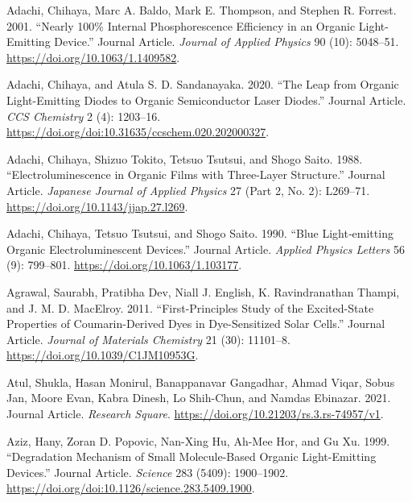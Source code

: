 \documentclass[
  letterpaper,
  DIV=11,
  numbers=noendperiod,
  oneside]{scrreprt}
\newlength{\cslhangindent}
\newlength{\cslentryspacingunit} %
\newenvironment{CSLReferences}[2] %
 {%
  \setlength{\parindent}{0pt}
  \ifodd #1
  \let\oldpar\par
  \def\par{\hangindent=\cslhangindent\oldpar}
  \fi
  \setlength{\parskip}{#2\cslentryspacingunit}
 }%
 {}
\begin{document}
\hypertarget{refs}{}
\begin{CSLReferences}{1}{0}
\leavevmode{}%
Adachi, Chihaya, Marc A. Baldo, Mark E. Thompson, and Stephen R.
Forrest. 2001. {``Nearly 100\% Internal Phosphorescence Efficiency in an
Organic Light-Emitting Device.''} Journal Article. \emph{Journal of
Applied Physics} 90 (10): 5048--51.
\url{https://doi.org/10.1063/1.1409582}.

\leavevmode{}%
Adachi, Chihaya, and Atula S. D. Sandanayaka. 2020. {``The Leap from
Organic Light-Emitting Diodes to Organic Semiconductor Laser Diodes.''}
Journal Article. \emph{CCS Chemistry} 2 (4): 1203--16.
\url{https://doi.org/doi:10.31635/ccschem.020.202000327}.

\leavevmode{}%
Adachi, Chihaya, Shizuo Tokito, Tetsuo Tsutsui, and Shogo Saito. 1988.
{``Electroluminescence in Organic Films with Three-Layer Structure.''}
Journal Article. \emph{Japanese Journal of Applied Physics} 27 (Part 2,
No. 2): L269--71. \url{https://doi.org/10.1143/jjap.27.l269}.

\leavevmode{}%
Adachi, Chihaya, Tetsuo Tsutsui, and Shogo Saito. 1990. {``Blue
Light‐emitting Organic Electroluminescent Devices.''} Journal Article.
\emph{Applied Physics Letters} 56 (9): 799--801.
\url{https://doi.org/10.1063/1.103177}.

\leavevmode{}%
Agrawal, Saurabh, Pratibha Dev, Niall J. English, K. Ravindranathan
Thampi, and J. M. D. MacElroy. 2011. {``First-Principles Study of the
Excited-State Properties of Coumarin-Derived Dyes in Dye-Sensitized
Solar Cells.''} Journal Article. \emph{Journal of Materials Chemistry}
21 (30): 11101--8. \url{https://doi.org/10.1039/C1JM10953G}.

\leavevmode{}%
Atul, Shukla, Hasan Monirul, Banappanavar Gangadhar, Ahmad Viqar, Sobus
Jan, Moore Evan, Kabra Dinesh, Lo Shih-Chun, and Namdas Ebinazar. 2021.
Journal Article. \emph{Research Square}.
\url{https://doi.org/10.21203/rs.3.rs-74957/v1}.

\leavevmode{}%
Aziz, Hany, Zoran D. Popovic, Nan-Xing Hu, Ah-Mee Hor, and Gu Xu. 1999.
{``Degradation Mechanism of Small Molecule-Based Organic Light-Emitting
Devices.''} Journal Article. \emph{Science} 283 (5409): 1900--1902.
\url{https://doi.org/doi:10.1126/science.283.5409.1900}.


\end{CSLReferences}
\end{document}
